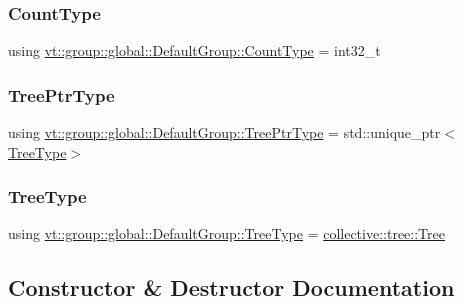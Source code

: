 \subsubsection{\texorpdfstring{Count\+Type}{CountType}}
{\footnotesize\ttfamily using \hyperlink{structvt_1_1group_1_1global_1_1_default_group_a838e3ed0bd877d6ff703705c00c66e95}{vt\+::group\+::global\+::\+Default\+Group\+::\+Count\+Type} =  int32\+\_\+t}

\mbox{\label{structvt_1_1group_1_1global_1_1_default_group_ab4b43c814196cd22463cfa0caad333d6}} 
\subsubsection{\texorpdfstring{Tree\+Ptr\+Type}{TreePtrType}}
{\footnotesize\ttfamily using \hyperlink{structvt_1_1group_1_1global_1_1_default_group_ab4b43c814196cd22463cfa0caad333d6}{vt\+::group\+::global\+::\+Default\+Group\+::\+Tree\+Ptr\+Type} =  std\+::unique\+\_\+ptr$<$\hyperlink{structvt_1_1group_1_1global_1_1_default_group_a86d7ec049ad79c17fcb6b428534d0c1c}{Tree\+Type}$>$}

\mbox{\label{structvt_1_1group_1_1global_1_1_default_group_a86d7ec049ad79c17fcb6b428534d0c1c}} 
\subsubsection{\texorpdfstring{Tree\+Type}{TreeType}}
{\footnotesize\ttfamily using \hyperlink{structvt_1_1group_1_1global_1_1_default_group_a86d7ec049ad79c17fcb6b428534d0c1c}{vt\+::group\+::global\+::\+Default\+Group\+::\+Tree\+Type} =  \hyperlink{structvt_1_1collective_1_1tree_1_1_tree}{collective\+::tree\+::\+Tree}}



\subsection{Constructor \& Destructor Documentation}
\mbox{\label{structvt_1_1group_1_1global_1_1_default_group_ab21200c02abd2a011352bee173951942}} 
